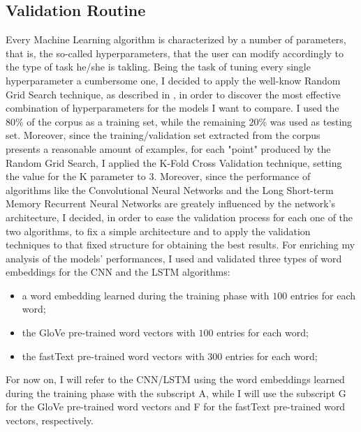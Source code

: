 \documentclass[11pt,twocolumn]{article}
\begin{document}
        \subsection{Validation Routine} %
        \label{sub:validation_routine}
            Every Machine Learning algorithm is characterized by a number of parameters, that is, the
            so-called hyperparameters, that the user can modify accordingly to the type of task he/she is
            takling. Being the task of tuning every single hyperparameter a cumbersome one, I decided to
            apply the well-know Random Grid Search technique, as described in \cite{random_grid_search}, in
            order to discover the most effective combination of hyperparameters for the models I want to
            compare. I used the $80\%$ of the corpus as a training set, while the remaining $20\%$ was used as
            testing set. Moreover, since the training/validation set extracted from the corpus
            presents a reasonable amount of examples, for each "point" produced by the Random Grid Search, I
            applied the K-Fold Cross Validation technique, setting the value for the K parameter to $3$.
            Moreover, since the performance of algorithms like the Convolutional Neural Networks and the
            Long Short-term Memory Recurrent Neural Networks are greately influenced by the network's
            architecture, I decided, in order to ease the validation process for each one of the two
            algorithms, to fix a simple architecture and to apply the validation techniques to that fixed
            structure for obtaining the best results. For enriching my analysis of the models' performances,
            I used and validated three types of word embeddings for the CNN and the LSTM algorithms:

            \begin{itemize}
                \item a word embedding learned during the training phase with $100$ entries for each word;
                \item the GloVe \cite{glove} pre-trained word vectors with $100$ entries for each word;
                \item the fastText \cite{fasttext} pre-trained word vectors with $300$ entries for each
                word;
            \end{itemize}

            \noindent
            For now on, I will refer to the CNN/LSTM using the word embeddings learned during the training
            phase with the subscript A, while I will use the subscript G for the GloVe pre-trained word
            vectors and F for the fastText pre-trained word vectors, respectively.
\end{document}
